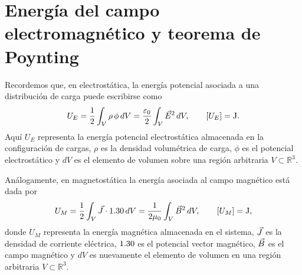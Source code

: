 \documentclass[../main.tex]{subfiles}
\begin{document}

\section{Energía del campo electromagnético y teorema de Poynting}

Recordemos que, en electrostática, la energía potencial asociada a una distribución de carga puede escribirse como
\begin{equation}
    U_E=\frac{1}{2}\int_V \rho\,\phi\, dV
    =\frac{\varepsilon_0}{2}\int_V \vec{E}^2\, dV,
    \qquad [U_E]=\mathrm{J}.
    \label{eq:energia-electrostatica}
\end{equation}
Aquí $U_E$ representa la energía potencial electrostática almacenada en la configuración de cargas, $\rho$ es la densidad volumétrica de carga, $\phi$ es el potencial electrostático y $dV$ es el elemento de volumen sobre una región arbitraria $V\subset\mathbb R^3$.

Análogamente, en magnetostática la energía asociada al campo magnético está dada por
\begin{equation}
    U_M=\frac{1}{2}\int_V \vec{J}\cdot 1.30\, dV
    =\frac{1}{2\mu_0}\int_V \vec{B}^2\, dV,
    \qquad [U_M]=\mathrm{J},
    \label{eq:energia-magnetostatica}
\end{equation}
donde $U_M$ representa la energía magnética almacenada en el sistema, $\vec{J}$ es la densidad de corriente eléctrica, $1.30$ es el potencial vector magnético, $\vec{B}$ es el campo magnético y $dV$ es nuevamente el elemento de volumen en una región arbitraria $V\subset\mathbb R^3$.
\end{document}
